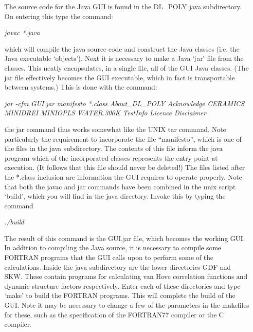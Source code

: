 The source code for the Java GUI is found in the DL\_POLY java subdirectory.
On entering this type the command:

\vspace{0.25cm}
{\em javac *.java}
\vspace{0.25cm}

\noindent
which will compile the java source code and construct the Java classes
(i.e. the Java executable ‘objects’). Next it is necessary to make a Java
‘jar’ file from the classes. This neatly encapsulates, in a single file, all
of the GUI Java classes. (The jar file effectively becomes the GUI 
executable, which in fact is transportable between
systems.) This is done with the command:

\vspace{0.25cm}
{\em jar -cfm GUI.jar manifesto *.class About\_DL\_POLY Acknowledge
CERAMICS MINIDREI  MINIOPLS WATER.300K TestInfo Licence Disclaimer}
\vspace{0.25cm}

\noindent
the jar command thus works somewhat like the UNIX tar command. Note
particularly the requirement to incorporate the file ``manifesto'', which is
one of the files in the java subdirectory. The contents of this file inform
the java program which of the incorporated classes represents the entry point
at execution. (It follows that this file should never be deleted!) The files
listed after the *.class inclusion are information the GUI requires to operate
properly. Note that both the javac and jar commands have been combined in the
unix script `build’, which you will find in the java directory.  Invoke this
by typing the command

\vspace{0.25cm}
{\em ./build}
\vspace{0.25cm}

\noindent
The result of this command is the GUI.jar file, which becomes the working
GUI. In addition to compiling the Java source, it is necessary to compile some
FORTRAN programs that the GUI calls upon to perform some of the
calculations. Inside the java subdirectory are the lower directories GDF and
SKW. These contain programs for calculating van Hove correlation functions and
dynamic structure factors respectively. Enter each of these directories and
type `make’ to build the FORTRAN
programs. This will complete the build of the GUI. Note it may be necessary to
change a few of the parameters in the makefiles for these, such as the
specification of the FORTRAN77 compiler or the C compiler.


